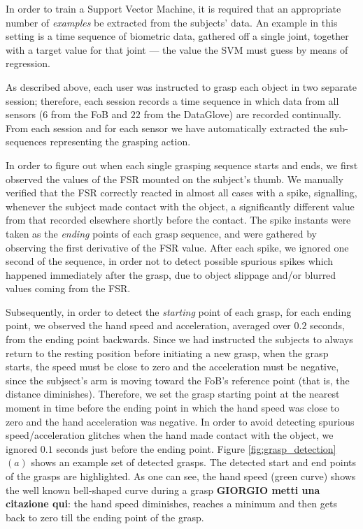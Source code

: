 In order to train a Support Vector Machine, it is required that an
appropriate number of \emph{examples} be extracted from the subjects'
data. An example in this setting is a time sequence of biometric data,
gathered off a single joint, together with a target value for that
joint --- the value the SVM must guess by means of regression.

As described above, each user was instructed to grasp each object in
two separate session; therefore, each session records a time sequence
in which data from all sensors ($6$ from the FoB and $22$ from the
DataGlove) are recorded continually. From each session and for each
sensor we have automatically extracted the sub-sequences representing
the grasping action.

In order to figure out when each single grasping sequence starts and
ends, we first observed the values of the FSR mounted on the subject's
thumb. We manually verified that the FSR correctly reacted in almost
all cases with a spike, signalling, whenever the subject made contact
with the object, a significantly different value from that recorded
elsewhere shortly before the contact. The spike instants were taken as
the \emph{ending} points of each grasp sequence, and were gathered by
observing the first derivative of the FSR value. After each spike, we
ignored one second of the sequence, in order not to detect possible
spurious spikes which happened immediately after the grasp, due to
object slippage and/or blurred values coming from the FSR.

Subsequently, in order to detect the \emph{starting} point of each
grasp, for each ending point, we observed the hand speed and
acceleration, averaged over $0.2$ seconds, from the ending point
backwards. Since we had instructed the subjects to always return to
the resting position before initiating a new grasp, when the grasp
starts, the speed must be close to zero and the acceleration must be
negative, since the subjsect's arm is moving toward the FoB's
reference point (that is, the distance diminishes). Therefore, we set
the grasp starting point at the nearest moment in time before the
ending point in which the hand speed was close to zero and the hand
acceleration was negative. In order to avoid detecting spurious
speed/acceleration glitches when the hand made contact with the
object, we ignored $0.1$ seconds just before the ending point. Figure
\ref{fig:grasp_detection} $(a)$ shows an example set of detected
grasps. The detected start and end points of the grasps are
highlighted. As one can see, the hand speed (green curve) shows the
well known bell-shaped curve during a grasp \cite{...} {\bf GIORGIO
metti una citazione qui}: the hand speed diminishes, reaches a minimum
and then gets back to zero till the ending point of the grasp.

